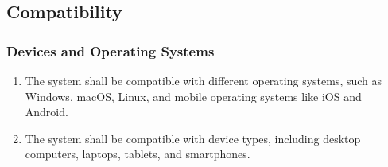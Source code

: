 \documentclass[]{article}
\begin{document}
         \subsection{Compatibility}
            \subsubsection{Devices and Operating Systems}
            \begin{enumerate}[label=\scriptsize\textbf{\textcolor{gray}{NFR-COMP-\arabic{compatibilityCounter}}}, leftmargin=*, itemsep=-4px]
                \item The system shall be compatible with different operating systems, such as Windows, macOS, Linux, and mobile operating systems like iOS and Android.
                \item The system shall be compatible with device types, including desktop computers, laptops, tablets, and smartphones.
            \end{enumerate}
\end{document}
